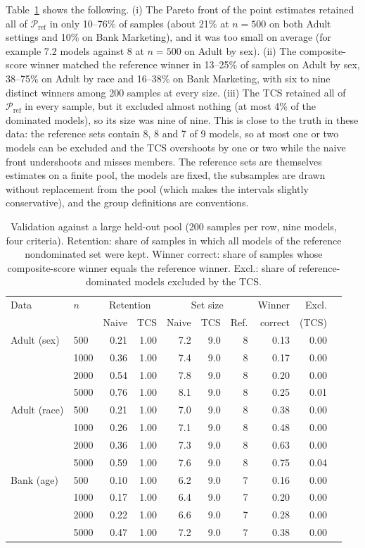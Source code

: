 \documentclass[pdflatex,sn-mathphys-num,iicol]{sn-jnl}
\theoremstyle{thmstyleone}
\theoremstyle{thmstyletwo}
\begin{document}
Table~\ref{tab:realval} shows the following. (i) The Pareto front of the point estimates retained all of $\mathcal{P}_{\mathrm{ref}}$ in only 10--76\% of samples (about 21\% at $n=500$ on both Adult settings and 10\% on Bank Marketing), and it was too small on average (for example 7.2 models against 8 at $n=500$ on Adult by sex). (ii) The composite-score winner matched the reference winner in 13--25\% of samples on Adult by sex, 38--75\% on Adult by race and 16--38\% on Bank Marketing, with six to nine distinct winners among 200 samples at every size. (iii) The TCS retained all of $\mathcal{P}_{\mathrm{ref}}$ in every sample, but it excluded almost nothing (at most 4\% of the dominated models), so its size was nine of nine. This is close to the truth in these data: the reference sets contain 8, 8 and 7 of 9 models, so at most one or two models can be excluded and the TCS overshoots by one or two while the naive front undershoots and misses members. The reference sets are themselves estimates on a finite pool, the models are fixed, the subsamples are drawn without replacement from the pool (which makes the intervals slightly conservative), and the group definitions are conventions.

\begin{table}[t]\centering\small
\caption{Validation against a large held-out pool (200 samples per row, nine models, four criteria). Retention: share of samples in which all models of the reference nondominated set were kept. Winner correct: share of samples whose composite-score winner equals the reference winner. Excl.: share of reference-dominated models excluded by the TCS.}\label{tab:realval}
\begin{tabular}{llrrrrrrrr}\toprule
Data & $n$ & \multicolumn{2}{c}{Retention} & \multicolumn{3}{c}{Set size} & Winner & Excl. \\
 & & Naive & TCS & Naive & TCS & Ref. & correct & (TCS) \\\midrule
Adult (sex) & 500 & 0.21 & 1.00 & 7.2 & 9.0 & 8 & 0.13 & 0.00 \\
 & 1000 & 0.36 & 1.00 & 7.4 & 9.0 & 8 & 0.17 & 0.00 \\
 & 2000 & 0.54 & 1.00 & 7.8 & 9.0 & 8 & 0.20 & 0.00 \\
 & 5000 & 0.76 & 1.00 & 8.1 & 9.0 & 8 & 0.25 & 0.01 \\
Adult (race) & 500 & 0.21 & 1.00 & 7.0 & 9.0 & 8 & 0.38 & 0.00 \\
 & 1000 & 0.26 & 1.00 & 7.1 & 9.0 & 8 & 0.48 & 0.00 \\
 & 2000 & 0.36 & 1.00 & 7.3 & 9.0 & 8 & 0.63 & 0.00 \\
 & 5000 & 0.59 & 1.00 & 7.6 & 9.0 & 8 & 0.75 & 0.04 \\
Bank (age) & 500 & 0.10 & 1.00 & 6.2 & 9.0 & 7 & 0.16 & 0.00 \\
 & 1000 & 0.17 & 1.00 & 6.4 & 9.0 & 7 & 0.20 & 0.00 \\
 & 2000 & 0.22 & 1.00 & 6.6 & 9.0 & 7 & 0.28 & 0.00 \\
 & 5000 & 0.47 & 1.00 & 7.2 & 9.0 & 7 & 0.38 & 0.00 \\
\bottomrule\end{tabular}
\end{table}
\end{document}
